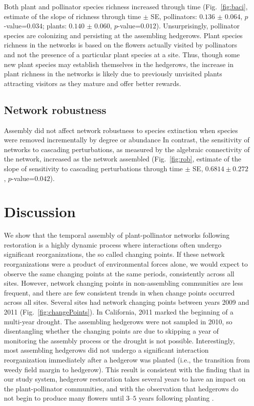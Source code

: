\documentclass[12pt]{article}
\begin{document}
Both plant and pollinator species richness increased through time
(Fig.~\ref{fig:baci}, estimate of the slope of richness through time
$\pm$ SE, pollinators: $0.136$ $\pm$ $0.064$, $p$-value=$0.034$;
plants: $0.140$ $\pm$ $0.060$, $p$-value=$0.012$). Unsurprisingly,
pollinator species are colonizing and persisting at the assembling
hedgerows. Plant species richness in the networks is based on the
flowers actually visited by pollinators and not the presence of a
particular plant species at a site. Thus, though some new plant
species may establish themselves in the hedgerows, the increase in
plant richness in the networks is likely due to previously unvisited
plants attracting visitors as they mature and offer better rewards.

\subsection*{Network robustness}
Assembly did not affect network robustness to species
extinction when species were removed incrementally by
degree or abundance %
In contrast, the sensitivity of networks to cascading perturbations,
as measured by the algebraic connectivity of the network, increased as
the network assembled (Fig.~\ref{fig:rob}, estimate of the slope of
sensitivity to cascading perturbations through time $\pm$ SE, $0.6814
\pm 0.272$, $p$-value=$0.042$).

\section*{Discussion}
\label{sec:discussion}

We show that the temporal assembly of plant-pollinator networks
following restoration is a highly dynamic process where interactions
often undergo significant reorganizations, the so called changing
points. If these network reorganizations were a product of
environmental forces alone, we would expect to observe the same
changing points at the same periods, consistently across all
sites. However, network changing points in non-assembling communities
are less frequent, and there are few consistent trends in when change
points occurred across all sites. Several sites had network changing
points between years 2009 and 2011 (Fig.~\ref{fig:changePoints}). In
California, 2011 marked the beginning of a multi-year drought. The
assembling hedgerows were not sampled in 2010, so disentangling
whether the changing points are due to skipping a year of monitoring
the assembly process or the drought is not possible. Interestingly,
most assembling hedgerows did not undergo a significant interaction
reorganization immediately after a hedgerow was planted (i.e., the
transition from weedy field margin to hedgerow). This result is
consistent with the finding that in our study system, hedgerow
restoration takes several years to have an impact on the
plant-pollinator communities, and with the observation that hedgerows
do not begin to produce many flowers until $3$--$5$ years following
planting \citep{kremen-2015-602}.
\end{document}
